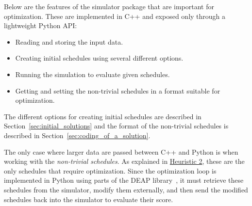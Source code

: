 Below are the features of the simulator package that are important for optimization. These are implemented in C++ and exposed only through a lightweight Python API:
\begin{itemize}
    \item Reading and storing the input data.
    \item Creating initial schedules using several different options.
    \item Running the simulation to evaluate given schedules.
    \item Getting and setting the non-trivial schedules in a format suitable for optimization.
\end{itemize}
The different options for creating initial schedules are described in Section~\ref{sec:initial_solutions} and the format of the non-trivial schedules is described in Section~\ref{sec:coding_of_a_solution}.


The only case where larger data are passed between C++ and Python is when working with the \textit{non-trivial schedules}.
As explained in \hyperref[para:heuristic_2]{Heuristic 2}, these are the only schedules that require optimization.
Since the optimization loop is implemented in Python using parts of the DEAP library~\cite{fortin2012deap}, it must retrieve these schedules from the simulator, modify them externally, and then send the modified schedules back into the simulator to evaluate their score.
